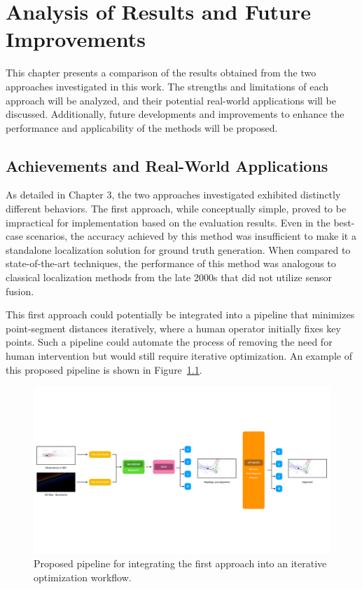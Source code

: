 \chapter{Analysis of Results and Future Improvements}

This chapter presents a comparison of the results obtained from the two approaches investigated in this work. The strengths and limitations of each approach will be analyzed, and their potential real-world applications will be discussed. Additionally, future developments and improvements to enhance the performance and applicability of the methods will be proposed.

\section{Achievements and Real-World Applications}

As detailed in Chapter 3, the two approaches investigated exhibited distinctly different behaviors. The first approach, while conceptually simple, proved to be impractical for implementation based on the evaluation results. Even in the best-case scenarios, the accuracy achieved by this method was insufficient to make it a standalone localization solution for ground truth generation. When compared to state-of-the-art techniques, the performance of this method was analogous to classical localization methods from the late 2000s that did not utilize sensor fusion.

This first approach could potentially be integrated into a pipeline that minimizes point-segment distances iteratively, where a human operator initially fixes key points. Such a pipeline could automate the process of removing the need for human intervention but would still require iterative optimization. An example of this proposed pipeline is shown in Figure~\ref{fig:mapalign_optimizer}.

\begin{figure}[H]
    \centering
    \includegraphics[width=1\linewidth]{LateX//figs/mapalign_optimizer.pdf}
    \caption{Proposed pipeline for integrating the first approach into an iterative optimization workflow.}
    \label{fig:mapalign_optimizer}
\end{figure}

